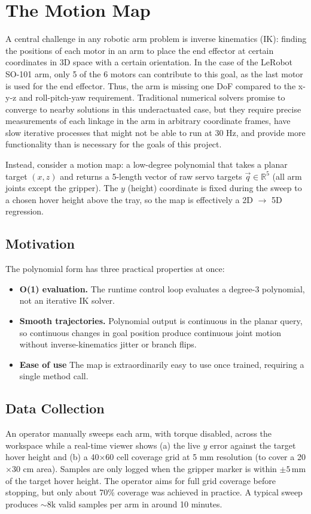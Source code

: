 \section{The Motion Map}
\label{sec:motionmap}

A central challenge in any robotic arm problem is inverse kinematics (IK): finding the positions of each motor in an arm to place the end effector at certain coordinates in 3D space with a certain orientation. In the case of the LeRobot SO-101 arm, only 5 of the 6 motors can contribute to this goal, as the last motor is used for the end effector. Thus, the arm is missing one DoF compared to the x-y-z and roll-pitch-yaw requirement. Traditional numerical solvers promise to converge to nearby solutions in this underactuated case, but they require precise measurements of each linkage in the arm in arbitrary coordinate frames, have slow iterative processes that might not be able to run at 30 Hz, and provide more functionality than is necessary for the goals of this project.

Instead, consider a motion map: a low-degree polynomial that takes a planar target $(x,z)$ and returns a 5-length vector of raw servo targets $\vec{q}\in\mathbb{R}^5$ (all arm joints except the gripper). The $y$ (height) coordinate is fixed during the sweep to a chosen hover height above the tray, so the map is
effectively a 2D $\!\to\!$ 5D regression.

\subsection{Motivation}
The polynomial form has three practical properties at once:
\begin{itemize}
  \item \textbf{O(1) evaluation.} The runtime control loop evaluates a degree-3 polynomial, not an iterative IK solver.
  \item \textbf{Smooth trajectories.} Polynomial output is
  continuous in the planar query, so continuous changes in goal
  position produce continuous joint motion without inverse-kinematics jitter or branch flips.
  \item \textbf{Ease of use} The map is extraordinarily easy to use once trained, requiring a single method call.
\end{itemize}

\subsection{Data Collection}
An operator manually sweeps each arm, with torque disabled, across the workspace while a real-time viewer shows (a) the live $y$ error against the target hover height and (b) a 40$\times$60 cell coverage grid at 5 mm resolution (to cover a 20$\times$30 cm area). Samples are only logged when the gripper marker is within $\pm5$\,mm of the target hover height. The operator aims for full grid coverage before stopping, but only about 70\% coverage was achieved in practice. A typical sweep produces $\sim$8k valid samples per arm in around 10 minutes. 

